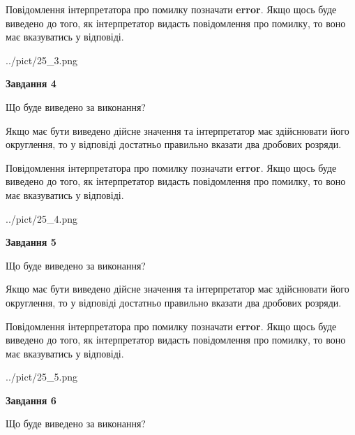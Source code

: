 \documentclass[12pt, ukrainian]{article}
\begin{document}
{\begin {Large}
Повідомлення інтерпретатора про помилку позначати \textbf{error}.
Якщо щось буде виведено до того, як інтерпретатор видасть повідомлення про помилку, 
то воно має вказуватись у відповіді. \par

\begin{center}
	{../pict/25_3.png}
\end{center}
\newpage

{\begin {center}\textbf{Завдання 4}\end {center}}\par
Що буде виведено за виконання? \par

Якщо має бути виведено дійсне значення та інтерпретатор має здійснювати його округлення, 
то у відповіді достатньо правильно вказати два дробових розряди.

Повідомлення інтерпретатора про помилку позначати \textbf{error}.
Якщо щось буде виведено до того, як інтерпретатор видасть повідомлення про помилку, 
то воно має вказуватись у відповіді. \par

\begin{center}
	{../pict/25_4.png}
\end{center}
\newpage

{\begin {center}\textbf{Завдання 5}\end {center}}\par
Що буде виведено за виконання? \par

Якщо має бути виведено дійсне значення та інтерпретатор має здійснювати його округлення, 
то у відповіді достатньо правильно вказати два дробових розряди.

Повідомлення інтерпретатора про помилку позначати \textbf{error}.
Якщо щось буде виведено до того, як інтерпретатор видасть повідомлення про помилку, 
то воно має вказуватись у відповіді. \par

\begin{center}
	{../pict/25_5.png}
\end{center}
\newpage

{\begin {center}\textbf{Завдання 6}\end {center}}\par
Що буде виведено за виконання? \par


\end{Large}}
\end{document}
